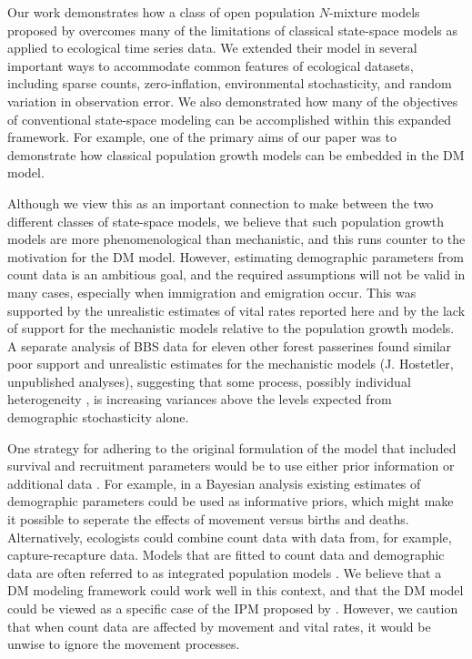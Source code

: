 \documentclass[12pt,english]{article}
\begin{document}
\begin{spacing}{1.9}
\begin{flushleft}
Our work demonstrates how a class of open population $N$-mixture models
proposed by \citet{dail_madsen:2011} overcomes 
many of the limitations of classical state-space models as applied to
ecological time series data.
We extended their model in several important
ways to accommodate common features of ecological
datasets, including sparse counts, zero-inflation, environmental
stochasticity, and random variation in observation error.
We also demonstrated how many of the objectives of conventional
state-space modeling can be accomplished within this expanded
framework. For example, one of the primary aims of our paper was to demonstrate how classical
population growth models can be embedded in the DM model.

Although we view this as an important connection to make between the two
different classes of state-space models, we believe that
such population growth models are more phenomenological
than mechanistic, and this runs counter to the motivation for
the DM model. However, estimating
demographic parameters from count data is an ambitious goal, and
the required assumptions will not be valid in many cases,
especially when immigration and emigration occur. This was supported by the
unrealistic estimates of vital rates reported here and by the
lack of support for the mechanistic models relative to the population
growth models.  A separate analysis of BBS data for eleven other forest passerines
found similar poor support and unrealistic estimates for the mechanistic 
models (J. Hostetler, unpublished analyses), suggesting that some process, possibly
individual heterogeneity \citep{vindenes_etal:2008}, is increasing variances
above the levels expected from demographic stochasticity alone.

One strategy for adhering to the original formulation of the
model that included survival and recruitment parameters would be to
use either prior information or additional data \citep{zipkin_etal:2014}. For example, in a 
Bayesian analysis existing estimates of demographic parameters
could be used as informative priors, which might make it possible to
seperate the effects of movement versus births and deaths.
Alternatively, ecologists could combine count data with data
from, for example,
capture-recapture data. Models that are fitted to count data and
demographic data are often referred to as integrated population models
\citep[IPM;][]{besbeas_etal:2002,schaub_etal:2007,chandler_clark:2014}.
We believe that a DM modeling framework could work well in this context,
and that the DM model could be viewed as a specific case of the
IPM proposed by \citet{buckland_etal:2004}.
However, we caution that when count data are affected by
movement and vital rates, it would be unwise to ignore the movement
processes.


\end{flushleft}
\end{spacing}
\end{document}
